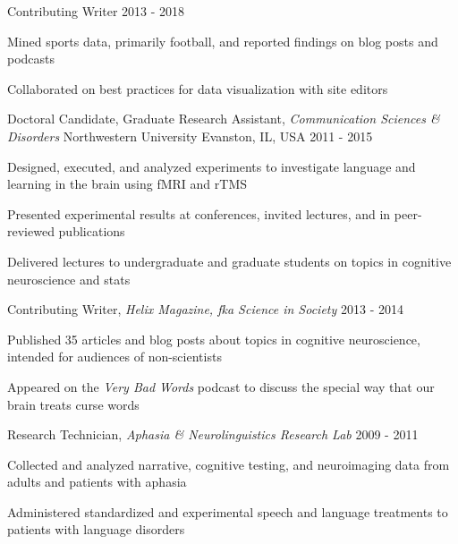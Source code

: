 \begin{cventries}
   \cventry
   {Contributing Writer}
   {}
   {}
   {2013 - 2018}
   {
      \begin{cvitems}
       \item {Mined sports data, primarily football, and reported findings on blog posts and podcasts}
       \item {Collaborated on best practices for data visualization with site editors}
      \end{cvitems}
    }

 \cventry
    {Doctoral Candidate, Graduate Research Assistant, \textit{Communication Sciences \& Disorders}} %
    {Northwestern University} %
    {Evanston, IL, USA} %
    {2011 - 2015} %
   {
    \begin{cvitems}
    \item {Designed, executed, and analyzed experiments to investigate language and learning in the brain using fMRI and rTMS}
    \item {Presented experimental results at conferences, invited lectures, and in peer-reviewed publications} 
    \item {Delivered lectures to undergraduate and graduate students on topics in cognitive neuroscience and stats} 
    \end{cvitems}
    }
    
   \cventry
    {Contributing Writer, \textit{Helix Magazine, fka Science in Society}}
    {}
    {}
    {2013 - 2014}
    {
      \begin{cvitems}
      \item {Published 35 articles and blog posts about topics in cognitive neuroscience, intended for audiences of non-scientists}
      \item {Appeared on the \textit{Very Bad Words} podcast to discuss the special way that our brain treats curse words}
      \end{cvitems}
    }

  \cventry
    {Research Technician, \textit{Aphasia \& Neurolinguistics Research Lab}} %
    {} %
    {} %
    {2009 - 2011} %
    {
      \begin{cvitems} %
        \item {Collected and analyzed narrative, cognitive testing, and neuroimaging data from adults and patients with aphasia}
        \item {Administered standardized and experimental speech and language treatments to patients with language disorders}
      \end{cvitems}
    }


\end{cventries}
